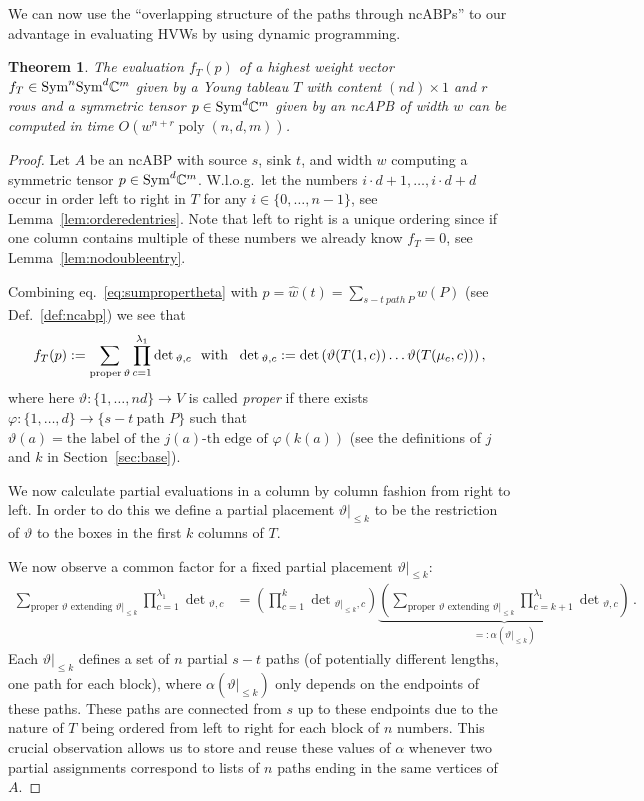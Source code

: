 \documentclass[10pt,a4paper]{article}
\numberwithin{equation}{section}
\newtheorem{theorem}[equation]{Theorem}
\theoremstyle{definition}
\newcommand{\Sym}{\textup{Sym}}
\newcommand{\IC}{\mathbb{C}}
\DeclareMathOperator{\poly}{poly}
\begin{document}
We can now use the ``overlapping structure of the paths through ncABPs'' to our advantage in evaluating HVWs by using dynamic programming.
\begin{theorem}
    \label{thm:evalabp}
    The evaluation $f_T(p)$ of a highest weight vector $f_T \in \Sym^n\Sym^d \IC^m$ given by a Young tableau $T$ with content $(nd) \times 1$ and $r$ rows and a symmetric tensor $p \in \Sym^d\IC^m$ given by an ncAPB of width $w$ can be computed in time $O(w^{n + r}\poly(n,d,m))$.
\end{theorem}
\begin{proof}
Let $A$ be an ncABP with source $s$, sink $t$, and width $w$ computing a symmetric tensor $p \in \Sym^d \IC^m$.
W.l.o.g.\ let the numbers $i \cdot d + 1, \ldots, i \cdot d + d$ occur in order left to right in $T$ for any $i \in \{0, \ldots, n-1\}$, see Lemma~\ref{lem:orderedentries}.
%
Note that left to right is a unique ordering since if one column contains multiple of these numbers we already know $f_T = 0$, see Lemma~\ref{lem:nodoubleentry}.

Combining eq.~\eqref{eq:sumpropertheta} with
$
    p = \hat{w}(t) = \sum_{s-t\ path\ P}w(P)
$ (see Def.~\ref{def:ncabp})
we see that
\begin{equation}\label{eq:sumproperthetapaths}
    f_T(p)
    := \sum_{\text{proper\,}\vartheta} \prod_{c = 1}^{\lambda_1}\det{}_{\vartheta, c} \ \text{ with } \ \det{}_{\vartheta, c} := \det\left(\vartheta(T(1, c)) \dots \vartheta(T(\mu_c, c))\right),
\end{equation}
where here $\vartheta:\{1,\ldots,nd\}\to V$ is called \emph{proper} if there exists $\varphi:\{1,\ldots,d\}\to\{s-t\  \text{path } P\}$ such that $\vartheta(a)=\text{the label of the $j(a)$-th edge of } \varphi(k(a))$ (see the definitions of $j$ and $k$ in Section~\ref{sec:base}).

We now calculate partial evaluations in a column by column fashion from right to left.
In order to do this we define a partial placement $\vartheta|_{\leq k}$ to be the restriction of $\vartheta$ to the boxes in the first $k$ columns of $T$.

We now observe a common factor for a fixed partial placement $\vartheta|_{\leq k}$:
\begin{align*}
    \sum_{\text{proper $\vartheta$ extending $\vartheta|_{\leq k}$}}\prod_{c = 1}^{\lambda_1}\det{}_{\vartheta,c}
    &=
    \left(\prod_{c = 1}^{k}\det{}_{\vartheta|_{\leq k},c}\right) \underbrace{\left(\sum_{\text{proper $\vartheta$ extending $\vartheta|_{\leq k}$}}\prod_{c = k+1}^{\lambda_1}\det{}_{\vartheta,c}\right)}_{=:\alpha(\vartheta|_{\leq k})}\,.
\end{align*}
Each $\vartheta|_{\leq k}$ defines a set of $n$ partial $s-t$ paths (of potentially different lengths, one path for each block), where $\alpha(\vartheta|_{\leq k})$ only depends on the endpoints of these paths.
These paths are connected from $s$ up to these endpoints due to the nature of $T$ being ordered from left to right for each block of $n$ numbers.
This crucial observation allows us to store and reuse these values of $\alpha$ whenever two partial assignments correspond to lists of $n$ paths ending in the same vertices of $A$.


\end{proof}
\end{document}

